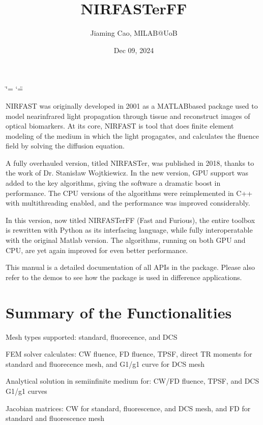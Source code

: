 \documentclass[letterpaper,10pt,english]{sphinxmanual}
\title{NIRFASTerFF}
\date{Dec 09, 2024}
\author{Jiaming Cao, MILAB@UoB}
\begin{document}
\ifdefined\shorthandoff
  \ifnum\catcode`\=\string=\active\shorthandoff{=}\fi
  \ifnum\catcode`\"=\active{}\fi
\fi

\pagestyle{empty}
\sphinxmaketitle
\pagestyle{plain}
\sphinxtableofcontents
\pagestyle{normal}
\label{\detokenize{index::doc}}


\sphinxAtStartPar
NIRFAST was originally developed in 2001 as a MATLAB\sphinxhyphen{}based package used to model near\sphinxhyphen{}infrared light propagation through tissue and reconstruct images of optical biomarkers. At its core, NIRFAST is tool that does finite element modeling of the medium in which the light progagates, and calculates the fluence field by solving the diffusion equation.

\sphinxAtStartPar
A fully overhauled version, titled NIRFASTer, was published in 2018, thanks to the work of Dr. Stanisław Wojtkiewicz. In the new version, GPU support was added to the key algorithms, giving the software a dramatic boost in performance. The CPU versions of the algorithms were re\sphinxhyphen{}implemented in C++ with multithreading enabled, and the performance was improved considerably.

\sphinxAtStartPar
In this version, now titled NIRFASTerFF (Fast and Furious), the entire toolbox is re\sphinxhyphen{}written with Python as its interfacing language, while fully inter\sphinxhyphen{}operatable with the original Matlab version. The algorithms, running on both GPU and CPU, are yet again improved for even better performance.

\sphinxAtStartPar
This manual is a detailed documentation of all APIs in the package. Please also refer to the demos to see how the package is used in difference applications.


\chapter{Summary of the Functionalities}
\label{\detokenize{index:summary-of-the-functionalities}}
\sphinxAtStartPar
Mesh types supported: standard, fluorecence, and DCS

\sphinxAtStartPar
FEM solver calculates: CW fluence, FD fluence, TPSF, direct TR moments for standard and fluorecence mesh, and G1/g1 curve for DCS mesh

\sphinxAtStartPar
Analytical solution in semi\sphinxhyphen{}infinite medium for: CW/FD fluence, TPSF, and DCS G1/g1 curves

\sphinxAtStartPar
Jacobian matrices: CW for standard, fluorescence, and DCS mesh, and FD for standard and fluorescence mesh
\end{document}
